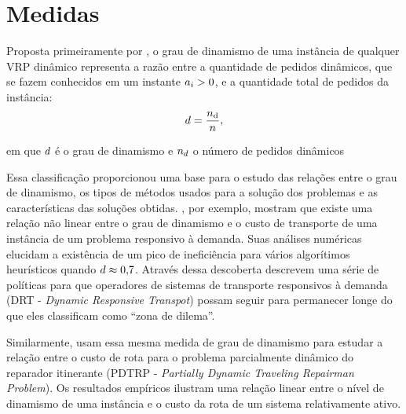 \chapter{Medidas}\label{ch:medidas}



Proposta primeiramente por , o grau de dinamismo
de uma instância de qualquer VRP dinâmico representa a razão entre a quantidade
de pedidos dinâmicos, que se fazem conhecidos em um instante
$a_i > 0$, e a quantidade total de pedidos da instância:
%
\begin{equation}
  d = \frac{n_{\text{d}}}{n},
  \label{eq:degreeOfDynamism}
\end{equation}

\noindent em que $d$ é o grau de dinamismo e 
$n_{d}$ o número de pedidos dinâmicos

Essa classificação proporcionou uma base para o estudo das relações entre o 
grau de dinamismo, os tipos de métodos usados para a solução dos 
problemas e as características das soluções obtidas.
, por exemplo, mostram que existe uma relação não
linear entre o grau de dinamismo e o custo de transporte de uma instância de um
problema responsivo à demanda.
Suas análises numéricas elucidam a existência de um pico de ineficiência para
vários algorítimos heurísticos quando $d \approx 0{,}7$.
Através dessa descoberta  descrevem uma série de
políticas para que operadores de sistemas de transporte responsivos à demanda
(DRT - \textit{Dynamic Responsive Transpot}) possam seguir para permanecer 
longe do que eles classificam como ``zona de dilema''.

Similarmente,  usam essa mesma medida de 
grau de dinamismo para estudar a relação entre o custo de rota para o 
problema parcialmente dinâmico do reparador itinerante 
(PDTRP - \textit{Partially Dynamic Traveling Repairman Problem}).
Os resultados empíricos ilustram uma relação linear entre o nível de
dinamismo de uma instância e o custo da rota de um sistema relativamente ativo.


